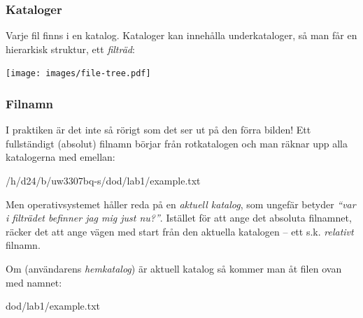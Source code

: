 \begin{frame}[fragile=singleslide]
    \frametitle{Kataloger}
    Varje fil finns i en katalog. Kataloger kan innehålla underkataloger, så man får en hierarkisk struktur, ett \emph{filträd}:

    \begin{center}
        \texttt{[image: images/file-tree.pdf]}
    \end{center}

\end{frame}

\begin{frame}[fragile=singleslide]
    \frametitle{Filnamn}
    I praktiken är det inte så rörigt som det ser ut på den förra bilden!
    Ett fullständigt (absolut) filnamn börjar från rotkatalogen och man räknar upp alla katalogerna med \code{/} emellan:

    \begin{Code}
        /h/d24/b/uw3307bq-s/dod/lab1/example.txt
    \end{Code}

    Men operativsystemet håller reda på en \emph{aktuell katalog}, som ungefär betyder \emph{``var i filträdet befinner jag mig just nu?''}. Istället för att ange det absoluta filnamnet, räcker det att ange vägen med start från den aktuella katalogen -- ett s.k. \emph{relativt} filnamn.

    \halfblankline

    Om  (användarens \emph{hemkatalog}) är aktuell katalog så kommer man åt filen ovan med namnet:

    \begin{Code}
        dod/lab1/example.txt
    \end{Code}

\end{frame}

